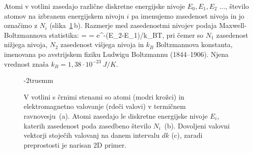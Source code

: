 Atomi v votlini zasedajo različne diskretne energijske nivoje
$E_0, E_1, E_2$ ..., število atomov na izbranem
energijskem nivoju $i$ pa imenujemo zasedenost nivoja in 
jo označimo z $N_i$ (slika~\ref{fig:11_votlina}\,b).
Razmerje med zasedenostmi nivojev podaja
Maxwell-Boltzmannova statistika:
\beq
{} =  = e^{-(E_2-E_1)/k_BT},
\label{eq:11_01}
\eeq
pri čemer so $N_1$ zasedenost nižjega nivoja, $N_2$ zasedenost višjega 
nivoja in $k_B$ Boltzmannova konstanta, imenovana po avstrijskem
fiziku Ludwigu Boltzmannu (1844--1906). Njena vrednost znaša 
$k_B = 1,38 \cdot 10^{-23}~\si{J/K}$.
\begin{figure}[h!]
\centering
\def\svgwidth{130truemm} 

\caption{V votlini s črnimi stenami so atomi (modri krožci) in 
elektromagnetno valovanje (rdeči valovi) v termičnem ravnovesju~(a). 
Atomi zasedajo le diskretne
energijske nivoje $E_i$, katerih zasedenost poda zasedbeno 
število $N_i$~(b). Dovoljeni valovni vektorji stoječih valovanj na danem intervalu $dk$ (c), zaradi
preprostosti je narisan 2D primer. 
}
\label{fig:11_votlina}
\vglue-2truemm
\end{figure}


